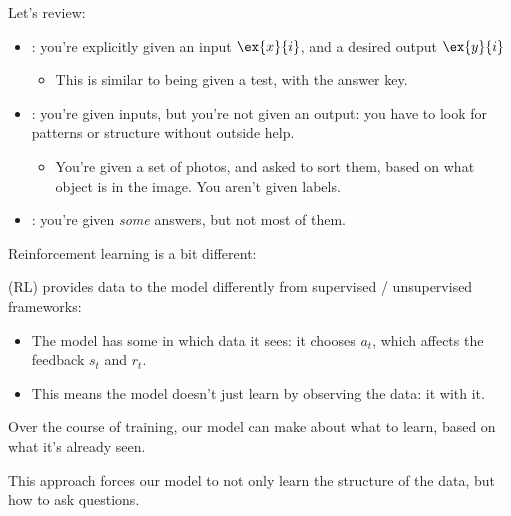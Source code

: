         Let's review:

        \begin{itemize}
            \item {}: you're explicitly given an input $\ex{x}{i}$, and a desired output $\ex{y}{i}$
                \begin{itemize}
                    \item \miniex This is similar to being given a test, with the answer key.
                \end{itemize}
            \item {}: you're given inputs, but you're not given an output: you have to look for patterns or structure without outside help.
                \begin{itemize}
                    \item \miniex You're given a set of photos, and asked to sort them, based on what object is in the image. You aren't given labels.
                \end{itemize}

            \item {}: you're given \textit{some} answers, but not most of them.
        \end{itemize}

        Reinforcement learning is a bit different:\\

        \begin{concept}
             (RL) provides data to the model differently from supervised / unsupervised frameworks:

            \begin{itemize}
                \item The model has some  in which data it sees: it chooses  $a_t$, which affects the feedback $s_t$ and $r_t$.

                \item This means the model doesn't just learn by observing the data: it  with it.
            \end{itemize}

            Over the course of training, our model can make  about what to learn, based on what it's already seen.
        \end{concept}

        This approach forces our model to not only learn the structure of the data, but how to ask questions.
        

